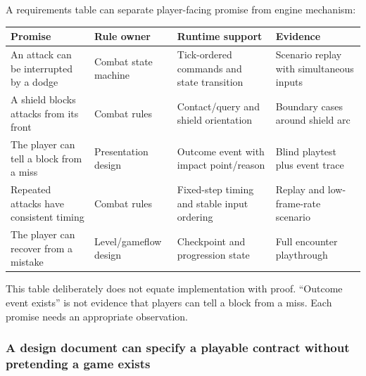 A requirements table can separate player-facing promise from engine mechanism:

{\def\LTcaptype{none} %
\begin{longtable}[]{@{}
  >{\raggedright\arraybackslash}p{}
  >{\raggedright\arraybackslash}p{}
  >{\raggedright\arraybackslash}p{}
  >{\raggedright\arraybackslash}p{}@{}}
\toprule\noalign{}
\begin{minipage}[b]{\linewidth}\raggedright
Promise
\end{minipage} & \begin{minipage}[b]{\linewidth}\raggedright
Rule owner
\end{minipage} & \begin{minipage}[b]{\linewidth}\raggedright
Runtime support
\end{minipage} & \begin{minipage}[b]{\linewidth}\raggedright
Evidence
\end{minipage} \\
\midrule\noalign{}
\endhead
\bottomrule\noalign{}
\endlastfoot
An attack can be interrupted by a dodge & Combat state machine & Tick-ordered commands and state transition & Scenario replay with simultaneous inputs \\
A shield blocks attacks from its front & Combat rules & Contact/query and shield orientation & Boundary cases around shield arc \\
The player can tell a block from a miss & Presentation design & Outcome event with impact point/reason & Blind playtest plus event trace \\
Repeated attacks have consistent timing & Combat rules & Fixed-step timing and stable input ordering & Replay and low-frame-rate scenario \\
The player can recover from a mistake & Level/gameflow design & Checkpoint and progression state & Full encounter playthrough \\
\end{longtable}
}

This table deliberately does not equate implementation with proof. ``Outcome event exists'' is not evidence that players can tell a block from a miss. Each promise needs an appropriate observation.

\subsubsection{A design document can specify a playable contract without pretending a game exists}\label{05-engine-i-ch009-a-design-document-can-specify-a-playable-contract-without-pretending-a-game-exists}

